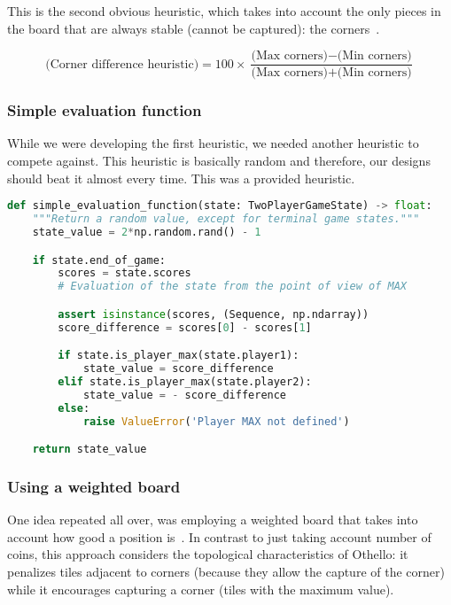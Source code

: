 \documentclass{article}
\begin{document}
This is the second obvious heuristic, which takes into account the only pieces in the board that are always stable (cannot be captured): the corners~\autocite{washington1}.

$$\text{(Corner difference heuristic)} = 100\times\frac{\text{(Max corners)}-\text{(Min corners)}}{\text{(Max corners)}+\text{(Min corners)}}$$

\subsubsection{Simple evaluation function}

While we were developing the first heuristic, we needed another heuristic to compete against. This heuristic is basically random and therefore, our designs should beat it almost every time. This was a provided heuristic.

\begin{lstlisting}[language=python, caption = Simple evaluation function,captionpos=t]
def simple_evaluation_function(state: TwoPlayerGameState) -> float:
    """Return a random value, except for terminal game states."""
    state_value = 2*np.random.rand() - 1

    if state.end_of_game:
        scores = state.scores
        # Evaluation of the state from the point of view of MAX

        assert isinstance(scores, (Sequence, np.ndarray))
        score_difference = scores[0] - scores[1]

        if state.is_player_max(state.player1):
            state_value = score_difference
        elif state.is_player_max(state.player2):
            state_value = - score_difference
        else:
            raise ValueError('Player MAX not defined')

    return state_value
\end{lstlisting}

\subsubsection{Using a weighted board}\label{static_board}

One idea repeated all over, was employing a weighted board that takes into account how good a position is~\autocite{washington1}. In contrast to just taking account number of coins, this approach considers the topological characteristics of Othello: it penalizes tiles adjacent to corners (because they allow the capture of the corner) while it encourages capturing a corner (tiles with the maximum value). 
\end{document}

